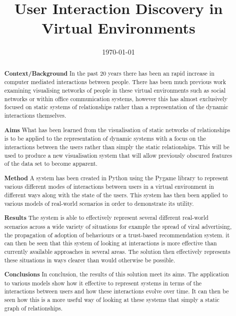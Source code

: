 \documentclass[12pt,a4paper]{article}
\title{User Interaction Discovery in Virtual Environments}
\date{\today}
\begin{document}
\maketitle

\begin{abstract}

\noindent
{\bf Context/Background}
In the past 20 years there has been an rapid increase in computer mediated interactions between people. There has been much previous work examining visualising networks of people in these virtual environments such as social networks or within office communication systems, however this has almost exclusively focused on static systems of relationships rather than a representation of the dynamic interactions themselves.

\noindent
{\bf Aims}
What has been learned from the visualisation of static networks of relationships is to be applied to the representation of dynamic systems with a focus on the interactions between the users rather than simply the static relationships. This will be used to produce a new visualisation system that will allow previously obscured features of the data set to become apparent.

\noindent
{\bf Method}
A system has been created in Python using the Pygame library to represent various different modes of interactions between users in a virtual environment in different ways along with the state of the users. This system has then been applied to various models of real-world scenarios in order to demonstrate its utility.

\noindent
{\bf Results}
The system is able to effectively represent several different real-world scenarios across a wide variety of situations for example the spread of viral advertising, the propagation of adoption of behaviours or a trust-based recommendation system. it can then be seen that this system of looking at interactions is more effective than currently available approaches in several areas. The solution then effectively represents these situations in ways clearer than would otherwise be possible.

\noindent
{\bf Conclusions}
In conclusion, the results of this solution meet its aims. The application to various models show how it effective to represent systems in terms of the interactions between users and how these interactions evolve over time. It can then be seen how this is a more useful way of looking at these systems that simply a static graph of relationships.

\end{abstract}
\end{document}
